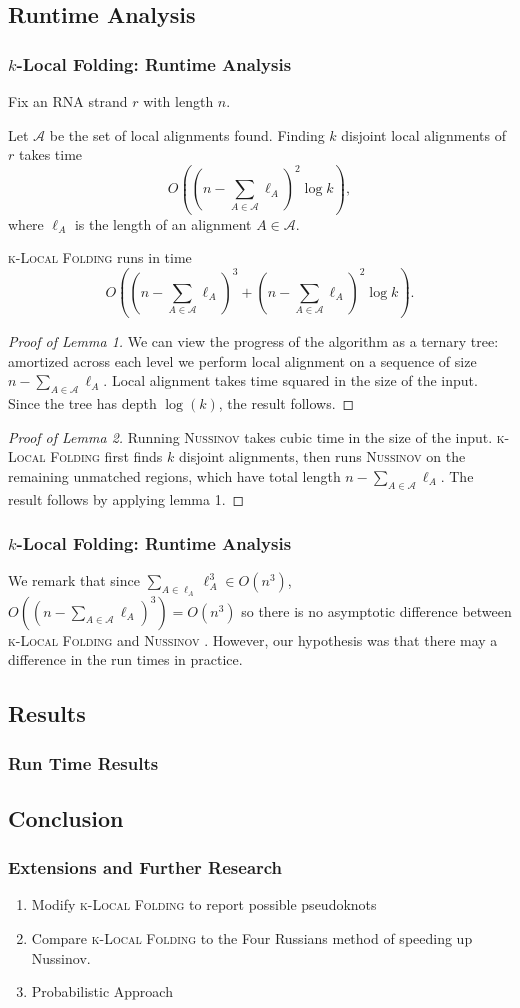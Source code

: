 \documentclass{beamer}
\newcommand{\klf}{\textsc{k-Local Folding} }
\newcommand{\rf}{\textsc{Nussinov} }
\newcommand{\al}{\mathscr{A}}
\begin{document}
\begin{frame}
\subsection{Runtime Analysis}
\frametitle{$k$-Local Folding: Runtime Analysis}
Fix an RNA strand $r$ with length $n$. 
\begin{lemma}
Let $\al$ be the set of local alignments found. Finding $k$ disjoint local alignments of $r$ takes time 
\[O\left(\left(n-\sum_{A\in\al}\ell_A\right)^2\log k\right),\]
where $\ell_A$ is the length of an alignment $A\in\al$. 
\end{lemma}
\begin{lemma}
\klf runs in time
\[O\left(\left(n-\sum_{A\in\al}\ell_A\right)^3+\left(n-\sum_{A\in\al}\ell_A\right)^2\log k\right).\]
\end{lemma}
\end{frame}

\begin{frame}
\begin{proof}[Proof of Lemma 1]
We can view the progress of the algorithm as a ternary tree: amortized across each level we perform local alignment on a sequence of size $n-\sum_{A\in\al}\ell_A$. Local alignment takes time squared in the size of the input. Since the tree has depth $\log(k)$, the result follows. 
\end{proof}
\begin{proof}[Proof of Lemma 2]
Running \rf takes cubic time in the size of the input. \klf first finds $k$ disjoint alignments, then runs \rf on the remaining unmatched regions, which have total length $n-\sum_{A\in\al}\ell_A$.   The result follows by applying lemma 1. 
\end{proof}
\end{frame}

\begin{frame}
\frametitle{$k$-Local Folding: Runtime Analysis}
We remark that since $\sum_{A\in\ell_A}\ell_A^3\in O(n^3)$, $O((n-\sum_{A\in\al}\ell_A)^3)=O(n^3)$ so there is no asymptotic difference between \klf and \rf.
However, our hypothesis was that there may a difference in the run times in practice.  
\end{frame}

\begin{frame}
\section{Results}
\frametitle{Run Time Results} 
\end{frame}
\begin{frame}
\section{Conclusion}
\frametitle{Extensions and Further Research}
\begin{enumerate}
\item Modify \klf to report possible pseudoknots 
\item Compare \klf to the Four Russians method of speeding up Nussinov.
\item  Probabilistic Approach
\end{enumerate}
\end{frame}
\end{document}
